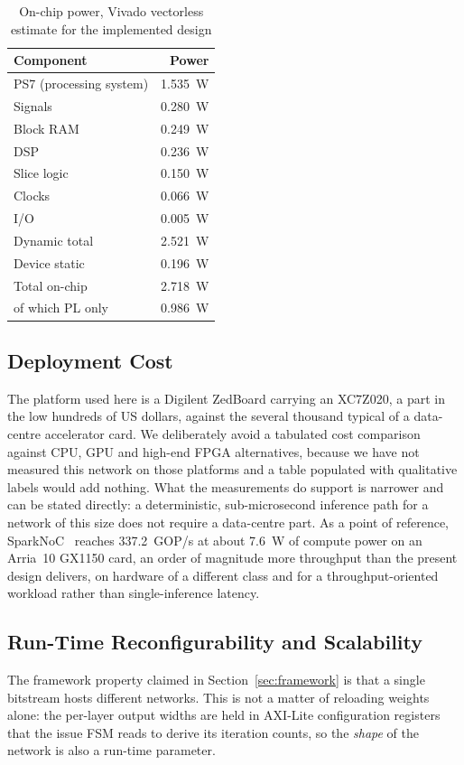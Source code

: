 \documentclass[final,5p,times,twocolumn]{elsarticle}
\begin{document}
\begin{table}[htbp]
\centering
\caption{On-chip power, Vivado vectorless estimate for the implemented design}
\label{tab:power}
\begin{tabular}{lr}
\toprule
Component & Power \\
\midrule
PS7 (processing system) & \SI{1.535}{\watt} \\
Signals                 & \SI{0.280}{\watt} \\
Block RAM               & \SI{0.249}{\watt} \\
DSP                     & \SI{0.236}{\watt} \\
Slice logic             & \SI{0.150}{\watt} \\
Clocks                  & \SI{0.066}{\watt} \\
I/O                     & \SI{0.005}{\watt} \\
\midrule
Dynamic total           & \SI{2.521}{\watt} \\
Device static           & \SI{0.196}{\watt} \\
\midrule
Total on-chip           & \SI{2.718}{\watt} \\
\quad of which PL only  & \SI{0.986}{\watt} \\
\bottomrule
\end{tabular}
\end{table}

\subsection{Deployment Cost}
The platform used here is a Digilent ZedBoard carrying an XC7Z020, a part in the
low hundreds of US dollars, against the several thousand typical of a
data-centre accelerator card. We deliberately avoid a tabulated cost comparison
against CPU, GPU and high-end FPGA alternatives, because we have not measured
this network on those platforms and a table populated with qualitative labels
would add nothing. What the measurements do support is narrower and can be
stated directly: a deterministic, sub-microsecond inference path for a network
of this size does not require a data-centre part. As a point of reference,
SparkNoC~\cite{sparknoc} reaches \SI{337.2}{GOP/s} at about \SI{7.6}{\watt} of
compute power on an Arria~10 GX1150 card, an order of magnitude more throughput
than the present design delivers, on hardware of a different class and for a
throughput-oriented workload rather than single-inference latency.

\subsection{Run-Time Reconfigurability and Scalability}
\label{sec:reconfig}
The framework property claimed in Section~\ref{sec:framework} is that a single
bitstream hosts different networks. This is not a matter of reloading weights
alone: the per-layer output widths are held in AXI-Lite configuration registers
that the issue FSM reads to derive its iteration counts, so the \emph{shape} of
the network is also a run-time parameter.
\end{document}
